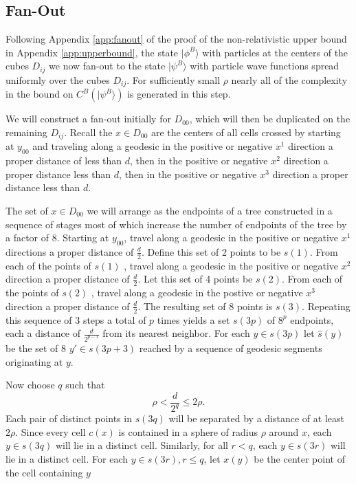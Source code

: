 \documentclass[twocolumn,amsmath,amssymb]{revtex4-1}
\begin{document}
\subsection{\label{app:fanoutr}Fan-Out}

Following Appendix \ref{app:fanout} of the proof of the
non-relativistic upper bound in Appendix \ref{app:upperbound},
the state $|\phi^B \rangle $ with particles at the centers of the cubes $D_{ij}$ we now fan-out
to the state $|\psi^B \rangle $ with particle wave functions spread uniformly over the
cubes $D_{ij}$. For sufficiently small $\rho$ nearly all of the complexity in
the bound on 
$C^B(|\psi^B \rangle )$ is generated in this step.

We will construct a fan-out initially for $D_{00}$, which will then
be duplicated on the remaining $D_{ij}$.  Recall the $x \in D_{00}$ are
the centers of all cells crossed by starting at $y_{00}$ and
traveling along a geodesic in the positive or negative $x^1$ direction
a proper distance of less than $d$,
then in the positive or negative $x^2$ direction a proper distance less than
$d$, then in the positive
or negative $x^3$ direction a proper distance less than $d$.

The set of $x \in D_{00}$ we will
arrange as the endpoints of a tree constructed in
a sequence of stages most of which increase the
number of endpoints of the tree by a factor of 8.
Starting at $y_{00}$, travel along
a geodesic in the positive or negative $x^1$ directions a proper distance
of $\frac{d}{2}$. Define this set of 2 points to be
$s(1)$. From each of the points of $s(1)$ , travel along a
geodesic in the positive or negative $x^2$ direction a proper distance
of $\frac{d}{2}$. Let this set of 4 points be $s(2)$. From each of
the points of $s(2)$ , travel along a geodesic
in the postive or negative $x^3$ direction a proper distance of $\frac{d}{2}$.
The resulting set of 8 points is $s(3)$.
Repeating this sequence of 3 steps a total of $p$ times yields a set $s(3p)$ of
$8^p$ endpoints, each a distance of $\frac{d}{2^{p-1}}$ from its nearest neighbor.
For each $y \in s(3p)$ let $\hat{s}(y)$ be the set of 8 $y' \in s(3p +3)$ reached by
a sequence of geodesic segments originating at $y$.

Now choose $q$ such that
\begin{equation}
  \label{choosep}
  \rho < \frac{d}{2^q} \le 2 \rho.
\end{equation}
Each pair of distinct points in $s(3q)$ will be separated by a distance of at least $2 \rho$.
Since every cell $c(x)$ is contained in a sphere of radius $\rho$ around $x$, each $y \in s(3q)$ will
lie in a distinct cell. Similarly, for all $r < q$, each $y \in s(3r)$ will lie in a distinct cell.
For each $y \in s(3r), r \le q$, let $x(y)$ be the center point of the cell containing $y$ 
\end{document}
